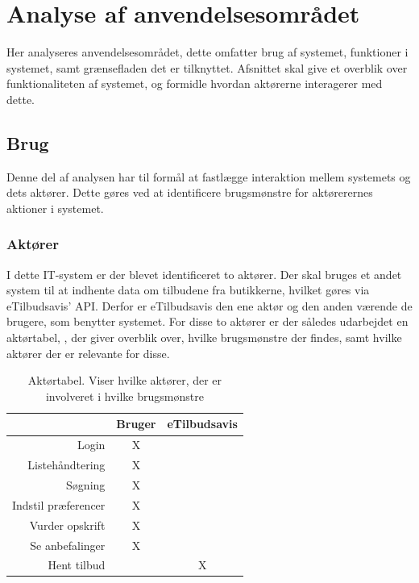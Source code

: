 \section{Analyse af anvendelsesområdet}\label{sec:anvendelses}
Her analyseres anvendelsesområdet, dette omfatter brug af systemet, funktioner i systemet, samt grænsefladen det er tilknyttet.\citep{OOA&D2001}
Afsnittet skal give et overblik over funktionaliteten af systemet, og formidle hvordan aktørerne interagerer med dette.

\subsection{Brug}
Denne del af analysen har til formål at fastlægge interaktion mellem systemets og dets aktører.
Dette gøres ved at identificere brugsmønstre for aktørerernes aktioner i systemet.

\subsubsection{Aktører}
I dette IT-system er der blevet identificeret to aktører.
Der skal bruges et andet system til at indhente data om tilbudene fra butikkerne, hvilket gøres via eTilbudsavis' API.
Derfor er eTilbudsavis den ene aktør og den anden værende de brugere, som benytter systemet.
For disse to aktører er der således udarbejdet en aktørtabel, , der giver overblik over, hvilke brugsmønstre der findes, samt hvilke aktører der er relevante for disse.

\begin{table}[h]
\centering
\begin{tabular}{rcc}
				    & Bruger               		& eTilbudsavis  \\ \hline
Login               & X		                    & 		 		\\
Listehåndtering     & X		                    & 		 		\\
Søgning             & X		                    & 		 		\\
Indstil præferencer & X		                    & 		 		\\
Vurder opskrift     & X		                    & 		 		\\
Se anbefalinger     & X		                    & 		 		\\
Hent tilbud		    & 							& X				\\ \hline
\end{tabular}
\caption{Aktørtabel. Viser hvilke aktører, der er involveret i hvilke brugsmønstre}\label{aktortabel}
\end{table}

